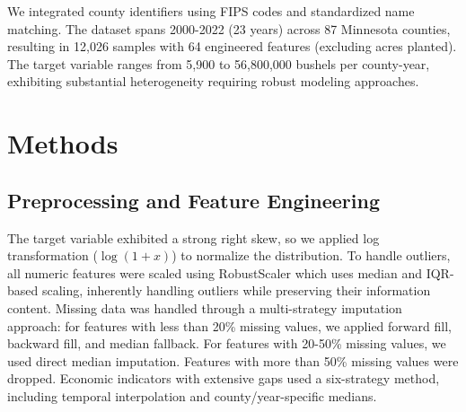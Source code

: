 \documentclass[twocolumn]{article}
\begin{document}
We integrated county identifiers using FIPS codes and standardized name matching. The dataset spans 2000-2022 (23 years) across 87 Minnesota counties, resulting in 12,026 samples with 64 engineered features (excluding acres planted). The target variable ranges from 5,900 to 56,800,000 bushels per county-year, exhibiting substantial heterogeneity requiring robust modeling approaches.

\begin{table}[htb]
\centering
\caption{Data Sources Summary}
\label{tab:data_sources_summary}
\end{table}

\section{Methods}

\subsection{Preprocessing and Feature Engineering}
The target variable exhibited a strong right skew, so we applied log transformation ($\log(1+x)$) to normalize the distribution. To handle outliers, all numeric features were scaled using RobustScaler which uses median and IQR-based scaling, inherently handling outliers while preserving their information content. Missing data was handled through a multi-strategy imputation approach: for features with less than 20\% missing values, we applied forward fill, backward fill, and median fallback. For features with 20-50\% missing values, we used direct median imputation. Features with more than 50\% missing values were dropped. Economic indicators with extensive gaps used a six-strategy method, including temporal interpolation and county/year-specific medians.
\end{document}
